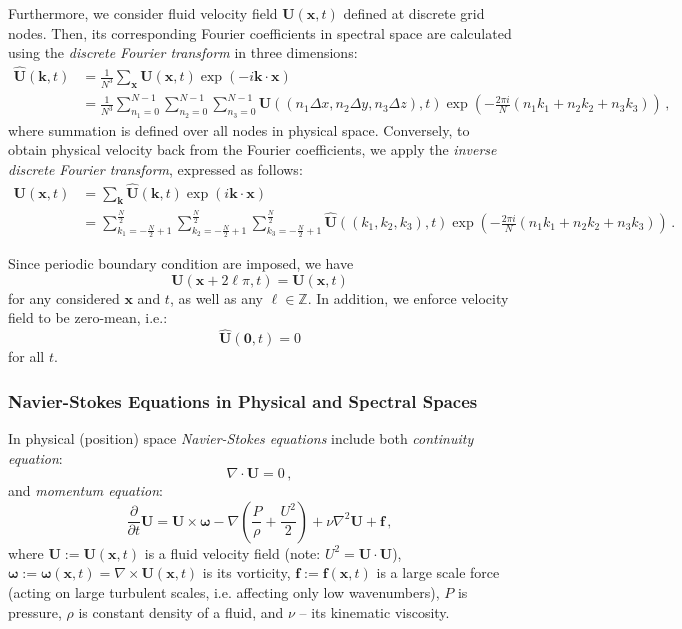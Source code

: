 \documentclass{pracamgren}
\begin{document}
Furthermore, we consider fluid velocity field $\mathbf{U}(\mathbf{x}, t)$ defined at discrete grid nodes.
Then, its corresponding Fourier coefficients in spectral space are calculated using the \emph{discrete Fourier transform} in three dimensions:
\begin{align*}
\mathbf{\hat{U}}(\mathbf{k}, t) &= \frac{1}{N^3} \sum_{\mathbf{x}} \mathbf{U}(\mathbf{x}, t) \exp(-i \mathbf{k} \cdot \mathbf{x}) \\
                                &= \frac{1}{N^3} \sum_{n_1 = 0}^{N-1} \sum_{n_2 = 0}^{N-1} \sum_{n_3 = 0}^{N-1} \mathbf{U} ((n_1 \Delta x, n_2 \Delta y, n_3 \Delta z), t) \exp(- \frac{2 \pi i}{N}(n_1 k_1 + n_2 k_2 + n_3 k_3)) \, ,
\end{align*}
where summation is defined over all nodes in physical space.
Conversely, to obtain physical velocity back from the Fourier coefficients, we apply the \emph{inverse discrete Fourier transform}, expressed as follows:
\begin{align*}
\mathbf{U}(\mathbf{x}, t) &= \sum_{\mathbf{k}} \mathbf{\hat{U}} (\mathbf{k}, t) \exp(i \mathbf{k} \cdot \mathbf{x}) \\
                          &= \sum_{k_1 = - \frac{N}{2} + 1}^{\frac{N}{2}} \sum_{k_2 = - \frac{N}{2} + 1}^{\frac{N}{2}} \sum_{k_3 = - \frac{N}{2} + 1}^{\frac{N}{2}} \mathbf{\hat{U}}((k_1, k_2, k_3), t) \exp(- \frac{2 \pi i}{N}(n_1 k_1 + n_2 k_2 + n_3 k_3)) \, .
\end{align*}

Since periodic boundary condition are imposed, we have
$$ \mathbf{U}(\mathbf{x} + 2 \ell \pi, t) = \mathbf{U}(\mathbf{x}, t)$$
for any considered $\mathbf{x}$ and $t$, as well as any $\ell \in \mathbb{Z}$.
In addition, we enforce velocity field to be zero-mean, i.e.:
$$ \mathbf{\hat{U}}(\mathbf{0}, t) = 0$$
for all $t$.

\subsubsection{Navier-Stokes Equations in Physical and Spectral Spaces}

In physical (position) space \emph{Navier-Stokes equations} include both \emph{continuity equation}:
\begin{equation}
\label{eqn:cont}
\nabla \cdot \mathbf{U} = 0 \, ,
\end{equation}
and \emph{momentum equation}:
\begin{equation}
\label{eqn:mom}
\frac{\partial}{\partial t} \mathbf{U} = \mathbf{U} \times \boldsymbol{\omega} - \nabla (\frac{P}{\rho} + \frac{U^2}{2}) + \nu \nabla^2 \mathbf{U} + \mathbf{f} \, ,
\end{equation}
where $\mathbf{U} := \mathbf{U}(\mathbf{x}, t)$ is a fluid velocity field (note: $U^2 = \mathbf{U} \cdot \mathbf{U}$), $ \boldsymbol{\omega} := \boldsymbol{\omega}(\mathbf{x}, t) = \nabla \times \mathbf{U}(\mathbf{x}, t) $ is its vorticity, $\mathbf{f} := \mathbf{f}(\mathbf{x}, t)$ is a large scale force (acting on large turbulent scales, i.e. affecting only low wavenumbers), $P$ is pressure, $\rho$ is constant density of a fluid, and $\nu$ -- its kinematic viscosity.
\end{document}
